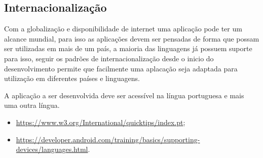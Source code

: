 














\subsection{Internacionalização}

Com a globalização e disponibilidade de internet uma aplicação pode ter um alcance mundial, para isso as aplicações devem ser pensadas de forma que possam ser utilizadas em mais de um país, a maioria das linguagens já possuem suporte para isso, seguir os padrões de internacionalização desde o inicio do desenvolvimento permite que facilmente uma aplacação seja adaptada para utilização em diferentes países e linguagens.

A aplicação a ser desenvolvida deve ser acessível na língua portuguesa e mais uma outra língua.

\begin{itemize}
    \item  \url{https://www.w3.org/International/quicktips/index.pt};
    
    \item \url{https://developer.android.com/training/basics/supporting-devices/languages.html}.
\end{itemize}


